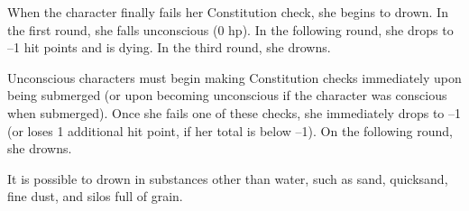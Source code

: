When the character finally fails her Constitution check, she begins to drown. In the first round, she falls unconscious (0 hp). In the following round, she drops to --1 hit points and is dying. In the third round, she drowns.
				
Unconscious characters must begin making Constitution checks immediately upon being submerged (or upon becoming unconscious if the character was conscious when submerged). Once she fails one of these checks, she immediately drops to --1 (or loses 1 additional hit point, if her total is below --1). On the following round, she drowns.
				
It is possible to drown in substances other than water, such as sand, quicksand, fine dust, and silos full of grain.
